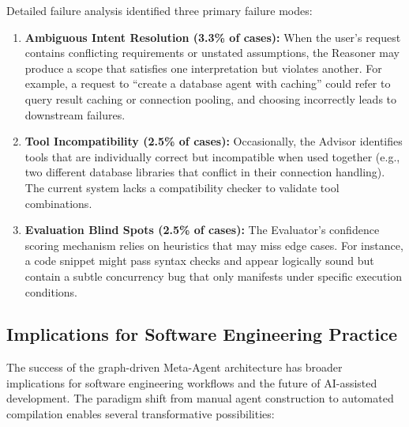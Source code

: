\documentclass[lettersize,journal]{IEEEtran}
\begin{document}
Detailed failure analysis identified three primary failure modes:
\begin{enumerate}
    \item \textbf{Ambiguous Intent Resolution (3.3\% of cases):} When the user's request contains conflicting requirements or unstated assumptions, the Reasoner may produce a scope that satisfies one interpretation but violates another. For example, a request to ``create a database agent with caching'' could refer to query result caching or connection pooling, and choosing incorrectly leads to downstream failures.
    \item \textbf{Tool Incompatibility (2.5\% of cases):} Occasionally, the Advisor identifies tools that are individually correct but incompatible when used together (e.g., two different database libraries that conflict in their connection handling). The current system lacks a compatibility checker to validate tool combinations.
    \item \textbf{Evaluation Blind Spots (2.5\% of cases):} The Evaluator's confidence scoring mechanism relies on heuristics that may miss edge cases. For instance, a code snippet might pass syntax checks and appear logically sound but contain a subtle concurrency bug that only manifests under specific execution conditions.
\end{enumerate}

\subsection{Implications for Software Engineering Practice}
The success of the graph-driven Meta-Agent architecture has broader implications for software engineering workflows and the future of AI-assisted development. The paradigm shift from manual agent construction to automated compilation enables several transformative possibilities:
\end{document}
